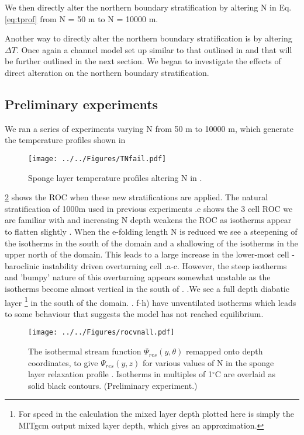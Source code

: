 We then directly alter the northern boundary stratification by altering N in Eq. \ref{eq:tprof} from N = 50 m to N = 10000 m. 

Another way to directly alter the northern boundary stratification is by altering $\Delta T$. Once again a channel model set up similar to that outlined in  and that will be further outlined in the next section. We began to investigate the effects of direct alteration on the northern boundary stratification.


\subsection{Preliminary experiments}

We ran a series of experiments varying N from 50 m to 10000 m, which generate the temperature profiles shown in 
\begin{figure}[H]
\center
\noindent \texttt{[image: ../../Figures/TNfail.pdf]}
\caption{Sponge layer temperature profiles altering N in .}
\label{fig:TNfail}
\end{figure}



\ref{fig:VNfail} shows the ROC when these new stratifications are applied. The natural stratification of 1000m used in previous experiments .e shows the 3 cell ROC we are familiar with and increasing N depth weakens the ROC as isotherms appear to flatten slightly . When the e-folding length N is reduced we see a steepening of the isotherms in the south of the domain and a shallowing of the isotherms in the upper north of the domain. This leads to a large increase in the lower-most cell - baroclinic instability driven overturning cell .a-c. However, the steep isotherms and 'bumpy' nature of this overturning appears somewhat unstable as the isotherms become almost vertical in the south of . .We see a full depth diabatic layer \footnote{For speed in the calculation the mixed layer depth plotted here is simply the MITgcm output mixed layer depth, which gives an approximation.} in the south of the domain. . f-h) have unventilated isotherms which leads to some behaviour that suggests the model has not reached equilibrium. 

\begin{figure}[H]
\center
\noindent \texttt{[image: ../../Figures/rocvnall.pdf]}
\caption{The isothermal stream function $\Psi_{res}(y,\theta)$ remapped onto depth coordinates, to give $\Psi_{res}(y,z)$ for various values of N in the sponge layer relaxation profile . Isotherms in multiples of 1$^{\circ}$C are overlaid as solid black contours. (Preliminary experiment.)}
\label{fig:VNfail}
\end{figure}

